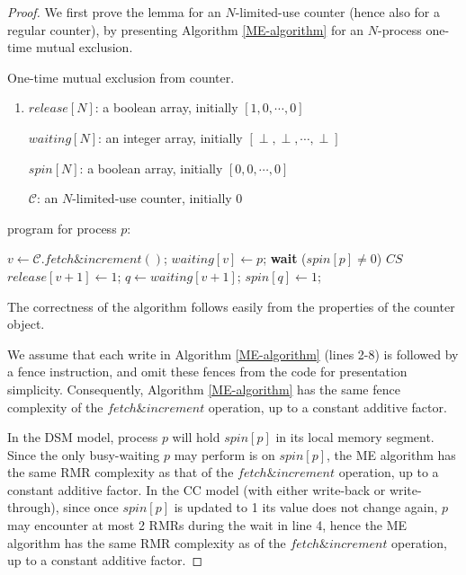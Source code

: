 	\begin{proof}
		We first prove the lemma for an $N$-limited-use counter (hence also for a regular counter), by presenting Algorithm \ref{ME-algorithm} for an $N$-process one-time mutual exclusion.
		
		\begin{algorithm}[b]
			\caption{One-time mutual exclusion from counter.}
			\label{ME-algorithm}
			\begin{enumerate}
				\parskip0pt
				\item $release[N]$: a boolean array, initially $[1,0,\cdots,0]$
				
				$waiting[N]$: an integer array, initially $[\perp,\perp,\cdots,\perp]$
				
				$spin[N]$: a boolean array, initially $[0,0,\cdots,0]$
				
				$\mathcal{C}$: an $N$-limited-use counter, initially 0
			\end{enumerate}
			
			program for process $p$:
			\begin{algorithmic}[1]
				\State $v \leftarrow \mathcal{C}.fetch \& increment()$;
				\State $waiting[v] \leftarrow p$;
				\State \textbf{wait} ($spin[p] \neq 0$)
				\EndIf
				\Statex $CS$
				\State $release[v+1] \leftarrow 1$;
				\State $q \leftarrow waiting[v+1]$;
				\State $spin[q] \leftarrow 1$;
				\EndIf
			\end{algorithmic}
		\end{algorithm}
		
		The correctness of the algorithm follows easily from the properties of the counter object.
		
		We assume that each write in Algorithm \ref{ME-algorithm} (lines 2-8) is followed by a fence instruction, and omit these fences from the code for presentation simplicity. Consequently, Algorithm \ref{ME-algorithm} has the same fence complexity of the $fetch\&increment$ operation, up to a constant additive factor.
		
		In the DSM model, process $p$ will hold $spin[p]$ in its local memory segment. Since the only busy-waiting $p$ may perform is on $spin[p]$, the ME algorithm has the same RMR complexity as that of the $fetch\&increment$ operation, up to a constant additive factor. In the CC model (with either write-back or write-through), since once $spin[p]$ is updated to 1 its value does not change again, $p$ may encounter at most 2 RMRs during the wait in line 4, hence the ME algorithm has the same RMR complexity as of the $fetch\&increment$ operation, up to a constant additive factor.
		

\end{proof}
